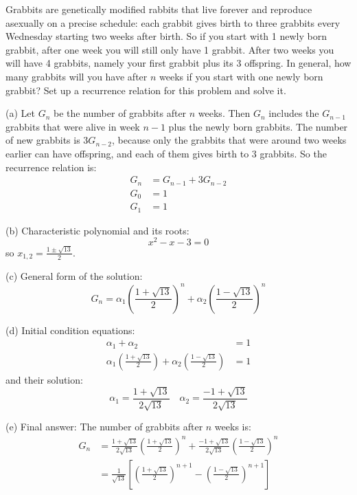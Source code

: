\documentclass[12pt]{article}
\begin{document}
\begin{problem}
Grabbits are genetically modified rabbits that live forever and reproduce asexually on a precise schedule: each grabbit gives birth to three grabbits every Wednesday starting two weeks after birth. So if you start with 1 newly born grabbit, after one week you will still only have 1 grabbit. After two weeks you will have 4 grabbits, namely your first grabbit plus its 3 offspring. In general, how many grabbits will you have after $n$ weeks if you start with one newly born grabbit? Set up a recurrence relation for this problem and solve it.


\smallskip
\noindent (a) Let $G_n$ be the number of grabbits after $n$ weeks. Then $G_n$ includes the $G_{n-1}$ grabbits that were alive in week $n-1$ plus the
newly born grabbits. The number of new grabbits is $3G_{n-2}$, because only the grabbits that were around two weeks earlier can have offspring, and each
of them gives birth to $3$ grabbits. So the recurrence relation is:
%
\begin{align*}
G_n &= G_{n-1} + 3G_{n-2}
	\\
G_0 &= 1
	\\
G_1 &= 1
\end{align*}


\smallskip \noindent 
(b) Characteristic polynomial and its roots:
%
\begin{equation*}
x^2 - x - 3 = 0
\end{equation*}
%
so $x_{1,2} = \frac{1\pm \sqrt {13}}{2}$.

\smallskip \noindent 
(c) General form of the solution:
%
\begin{equation*}
\textstyle G_n = \alpha _{1} (\frac{1 + \sqrt {13}}{2})^n + \alpha _{2} (\frac{1 - \sqrt {13}}{2})^n
\end{equation*}


\smallskip \noindent 
(d) Initial condition equations:
%
\begin{align*}
\alpha_1 + \alpha_2 &= 1 \\
\textstyle \alpha_1(\frac{1+\sqrt {13}}{2}) + \alpha_2(\frac{1-\sqrt {13}}{2}) &= 1
\end{align*}
%
and their solution:
%
\begin{equation*}
	\textstyle
\alpha_1 = \frac{1+\sqrt {13}}{2\sqrt{13}} \quad
\alpha_2 = \frac{-1+\sqrt {13}}{2\sqrt{13}}
\end{equation*}


\smallskip \noindent 
(e) Final answer:
The number of grabbits after $n$ weeks is:
%
\begin{align*}
G_n &= \textstyle \frac{1+\sqrt {13}}{2\sqrt{13}} (\frac{1+ \sqrt {13}}{2})^n 
					 + \frac{-1+\sqrt {13}}{2\sqrt{13}} (\frac{1- \sqrt {13}}{2})^n
					 \\
	&= \textstyle \frac{1}{\sqrt{13}} [ (\frac{1+ \sqrt {13}}{2})^{n+1} 
					 -  (\frac{1- \sqrt {13}}{2})^{n+1} ]
\end{align*}

\end{problem}
\end{document}
